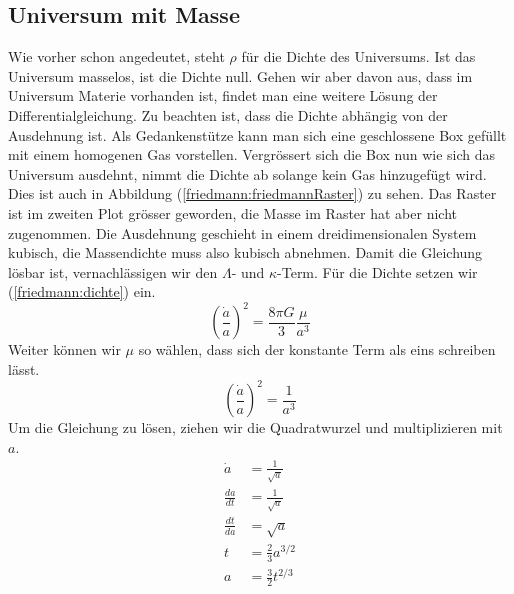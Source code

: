 \begin{refsection}
\subsection{Universum mit Masse \label{friedmann:UniversumMitMasse}} 
Wie vorher schon angedeutet, steht $\rho$ für die Dichte des Universums. Ist das Universum masselos, ist die Dichte null. Gehen wir aber davon aus, dass im Universum Materie vorhanden ist, findet man eine weitere Lösung der Differentialgleichung. Zu beachten ist, dass die Dichte abhängig von der Ausdehnung ist. Als Gedankenstütze kann man sich eine geschlossene Box gefüllt mit einem homogenen Gas vorstellen. Vergrössert sich die Box nun wie sich das Universum ausdehnt, nimmt die Dichte ab solange kein Gas hinzugefügt wird. Dies ist auch in Abbildung (\ref{friedmann:friedmannRaster}) zu sehen. Das Raster ist im zweiten Plot grösser geworden, die Masse im Raster hat aber nicht zugenommen. Die Ausdehnung geschieht in einem dreidimensionalen System kubisch, die Massendichte muss also kubisch abnehmen. Damit die Gleichung lösbar ist, vernachlässigen wir den $\Lambda$- und $\kappa$-Term. Für die Dichte setzen wir (\ref{friedmann:dichte}) ein. 
\[\left(\frac{\dot{a}}{a}\right) ^2 = \frac{8 \pi G}{3} \frac{\mu}{a^3}\]
Weiter können wir $\mu$ so wählen, dass sich der konstante Term als eins schreiben lässt.
\[\left(\frac{\dot{a}}{a}\right) ^2 = \frac{1}{a^3}\]
Um die Gleichung zu lösen, ziehen wir die Quadratwurzel und multiplizieren mit $a$.
\begin{align}
	\nonumber \dot{a} &= \frac{1}{\sqrt{a}} \\
	\nonumber \frac{da}{dt} &=\frac{1}{\sqrt{a}} \\
	\nonumber \frac{dt}{da} &= \sqrt{a} \\
	\nonumber t &= \frac{2}{3} a^{3/2} \\
	a &= \frac{3}{2} t^{2/3} \label{friedmann:Masse}
\end{align}


\end{refsection}
